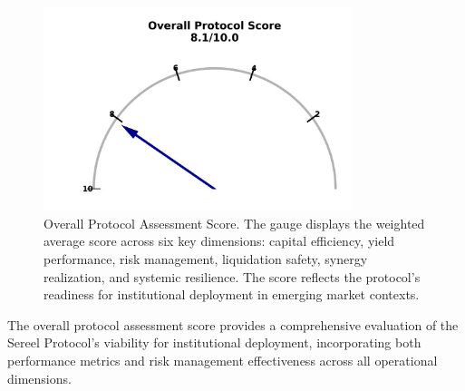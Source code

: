 \documentclass[12pt]{article}
\begin{document}
\begin{figure}[h]
    \centering
    \includegraphics[width=0.8\textwidth]{protocol_score_gauge.jpeg}
    \caption{Overall Protocol Assessment Score. The gauge displays the weighted average score across six key dimensions: capital efficiency, yield performance, risk management, liquidation safety, synergy realization, and systemic resilience. The score reflects the protocol's readiness for institutional deployment in emerging market contexts.}
    \label{fig:protocol_score}
\end{figure}

The overall protocol assessment score provides a comprehensive evaluation of the Sereel Protocol's viability for institutional deployment, incorporating both performance metrics and risk management effectiveness across all operational dimensions.
\end{document}
